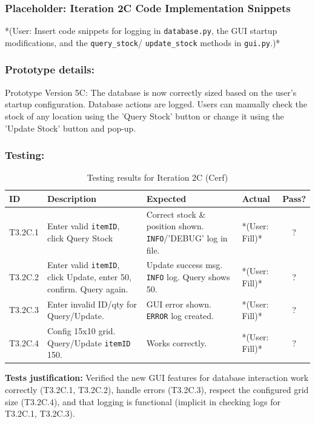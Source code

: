 \newpage
\subsubsection*{Placeholder: Iteration 2C Code Implementation Snippets}
*(User: Insert code snippets for logging in \verb|database.py|, the GUI startup modifications, and the \verb|query_stock|/ \verb|update_stock| methods in \verb|gui.py|.)*
\newpage

\subsubsection{Prototype details:}
Prototype Version 5C: The database is now correctly sized based on the user's startup configuration. Database actions are logged. Users can manually check the stock of any location using the 'Query Stock' button or change it using the 'Update Stock' button and pop-up.

\subsubsection{Testing:}
\begin{table}[htbp]
	\centering
	\begin{tabularx}{\textwidth}{|l|X|p{4.5cm}|p{1.5cm}|c|}
		\hline
		\textbf{ID} & \textbf{Description} & \textbf{Expected} & \textbf{Actual} & \textbf{Pass?} \\
		\hline
		T3.2C.1 & Enter valid \verb|itemID|, click Query Stock & Correct stock \& position shown. \verb|INFO|/'DEBUG' log in file. & *(User: Fill)* & ? \\
		\hline
		T3.2C.2 & Enter valid \verb|itemID|, click Update, enter 50, confirm. Query again. & Update success msg. \verb|INFO| log. Query shows 50. & *(User: Fill)* & ? \\
		\hline
		T3.2C.3 & Enter invalid ID/qty for Query/Update. & GUI error shown. \verb|ERROR| log created. & *(User: Fill)* & ? \\
		\hline
		T3.2C.4 & Config 15x10 grid. Query/Update \verb|itemID| 150. & Works correctly. & *(User: Fill)* & ? \\
		\hline
	\end{tabularx}
	\caption{Testing results for Iteration 2C (Cerf)}
\end{table}
\textbf{Tests justification:} Verified the new GUI features for database interaction work correctly (T3.2C.1, T3.2C.2), handle errors (T3.2C.3), respect the configured grid size (T3.2C.4), and that logging is functional (implicit in checking logs for T3.2C.1, T3.2C.3).

